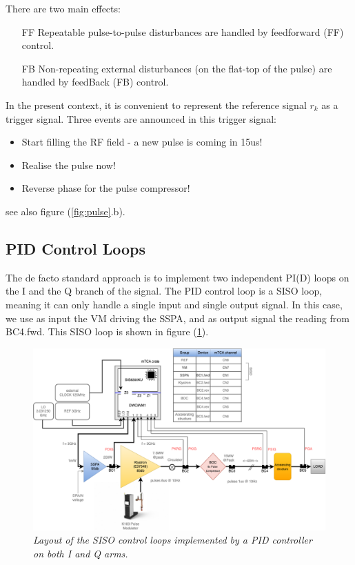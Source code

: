 \documentclass[12pt]{amsart}
\begin{document}
There are two main effects:
\begin{itemize}
\item[FF] Repeatable pulse-to-pulse disturbances are handled by feedforward (FF) control.
\item[FB] Non-repeating external disturbances (on the flat-top of the pulse) are handled by feedBack (FB) control.
\end{itemize}
In the present context, it is convenient to represent the reference signal $r_k$ as a trigger signal.
Three events are announced in this trigger signal:
\begin{itemize}
\item Start filling the RF field - a new pulse is coming in 15us! 
\item Realise the pulse now!
\item Reverse phase for the pulse compressor!
\end{itemize}
see also figure (\ref{fig:pulse}.b).




\subsection{PID Control Loops}



The de facto standard approach is to implement two independent PI(D) loops on the I and the Q branch of the signal.
The PID control loop is a SISO loop, meaning it can only handle a single input and single output signal.
In this case, we use as input the VM driving the SSPA, and as output signal the reading from BC4.fwd. 
This SISO loop is shown in figure (\ref{fig:loop2}).

\begin{figure}[htbp] %
   \centering
   \includegraphics[width=5in]{im/loop1.png} 
   \caption{\em Layout of the SISO control loops implemented by a PID controller on both I and Q arms.}
   \label{fig:loop2}
\end{figure}
\end{document}
